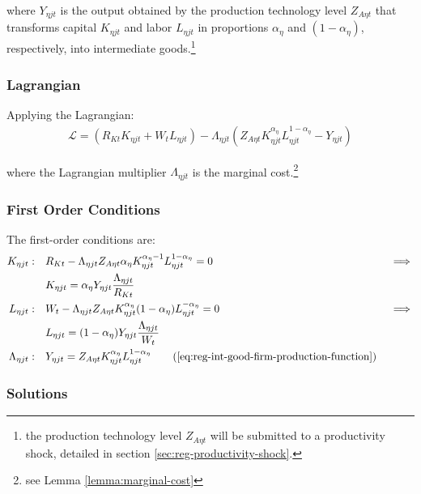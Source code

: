 \documentclass[
thesis.tex
]{subfiles}
\begin{document}
where $Y_{\eta jt}$ is the output obtained by the production technology level $Z_{A\eta t}$ that transforms capital $K_{\eta jt}$ and labor $L_{\eta jt}$ in proportions ${\alpha_{\eta}}$ and $(1-{\alpha_{\eta}})$, respectively, into intermediate goods.\footnote{the production technology level $Z_{A\eta t}$ will be submitted to a productivity shock, detailed in section \ref{sec:reg-productivity-shock}.}

\subsubsection*{Lagrangian}

Applying the Lagrangian:
\begin{align}
	\label{eq:reg-int-good-firm-lagrangian}
	\mathcal{L} = (R_{Kt} K_{\eta jt} + W_t L_{\eta jt}) - \Lambda_{\eta jt} (Z_{A\eta t} K_{\eta jt}^{\alpha_{\eta}} L_{\eta jt}^{1-{\alpha_{\eta}}} - Y_{\eta jt})
\end{align}

where the Lagrangian multiplier $\Lambda_{\eta jt}$ is the marginal cost.\footnote{see Lemma \ref{lemma:marginal-cost}}

\subsubsection*{First Order Conditions}

The first-order conditions are:
\begin{alignat}{2}
	K_{\eta jt}: \quad & R_{Kt} - \Lambda_{\eta jt} Z_{A\eta t} {\alpha_{\eta}} K_{\eta jt}^{{\alpha_{\eta}}-1} L_{\eta jt}^{1-{\alpha_{\eta}}} = 0 &&\implies \nonumber \\
	& K_{\eta jt} = {\alpha_{\eta}} Y_{\eta jt} \frac{\Lambda_{\eta jt}}{R_{Kt}} \label{eq:reg-int-good-firm-FOC-Kt} \\
	L_{\eta jt}: \quad & W_t - \Lambda_{\eta jt} Z_{A\eta t} K_{\eta jt}^{\alpha_{\eta}} (1-{\alpha_{\eta}}) L_{\eta jt}^{-{\alpha_{\eta}}} = 0 \quad &&\implies \nonumber \\ 
	& L_{\eta jt} = (1-{\alpha_{\eta}}) Y_{\eta jt} \frac{\Lambda_{\eta jt}}{W_t} \label{eq:reg-int-good-firm-FOC-Lt} \\
	\Lambda_{\eta jt}: \quad & Y_{\eta jt} = Z_{A\eta t} K_{\eta jt}^{\alpha_{\eta}} L_{\eta jt}^{1-{\alpha_{\eta}}} \tag{\ref{eq:reg-int-good-firm-production-function}}
\end{alignat}

\subsubsection*{Solutions}
\end{document}
